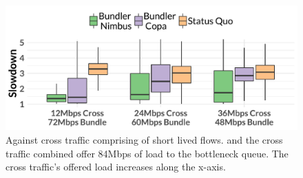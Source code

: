 \begin{figure}
    \centering
\begin{knitrout}
\color{fgcolor}
\includegraphics[width=\maxwidth]{figure/robust:cr-inelastic-1} 

\end{knitrout}
    \caption{Against cross traffic comprising of short lived flows. \name and the cross traffic combined offer 84Mbps of load to the bottleneck queue. The cross traffic's offered load increases along the x-axis.}
    \label{fig:robust:cr-inelastic}
\end{figure}
